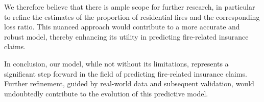 \documentclass[12pt]{article}  %
\begin{document}
We therefore believe that there is ample scope for further research, in particular to refine the estimates of the proportion of residential fires and the corresponding loss ratio. This nuanced approach would contribute to a more accurate and robust model, thereby enhancing its utility in predicting fire-related insurance claims.

In conclusion, our model, while not without its limitations, represents a significant step forward in the field of predicting fire-related insurance claims. Further refinement, guided by real-world data and subsequent validation, would undoubtedly contribute to the evolution of this predictive model.

\clearpage














\end{document}
